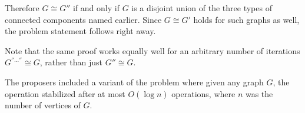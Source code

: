 Therefore $G \cong G''$ if and only if $G$
is a disjoint union of the three types of connected components named earlier.
Since $G \cong G'$ holds for such graphs as well, the problem statement follows right away.

\begin{remark*}
  Note that the same proof works equally well
  for an arbitrary number of iterations $G^{''\dots''} \cong G$,
  rather than just $G'' \cong G$.
\end{remark*}

\begin{remark*}
  The proposers included a variant of the problem where given any graph $G$,
  the operation stabilized after at most $O(\log n)$ operations,
  where $n$ was the number of vertices of $G$.
\end{remark*}

